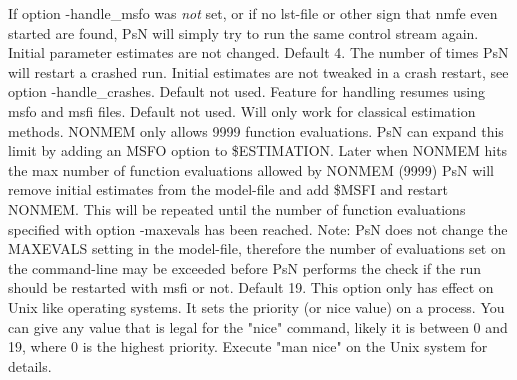 \begin{optionlist}
If option -handle\_msfo was \emph{not} set, or if no lst-file or other sign that nmfe even started are found,
PsN will simply try to run the same control stream again. Initial parameter estimates are not changed.  
\nextopt
{}
Default 4. The number of times PsN will restart a crashed run. Initial estimates are not tweaked in a crash restart, see option
-handle\_crashes.
\nextopt
{}
Default not used. Feature for handling resumes using msfo and msfi files. 
\nextopt
{}
Default not used. Will only work for classical estimation methods. NONMEM only allows 9999 function evaluations. PsN can expand this limit by adding an MSFO option to \$ESTIMATION. Later when NONMEM hits the max number of function evaluations allowed by NONMEM (9999) PsN will remove initial estimates from the model-file and add \$MSFI and restart NONMEM. This will be repeated until the number of function evaluations specified with option -maxevals has been reached. Note: PsN does not change the MAXEVALS setting in the model-file, therefore the number of evaluations set on the command-line may be exceeded before PsN performs the check if the run should be restarted with msfi or not. 
\nextopt
{}
Default 19. This option only has effect on Unix like operating systems. It  sets the priority (or nice value) on a process. You can give any value that is legal for the "nice" command, likely it is between 0 and 19, where 0 is the highest priority. Execute "man nice" on the Unix system for details. 
\nextopt
\end{optionlist}
